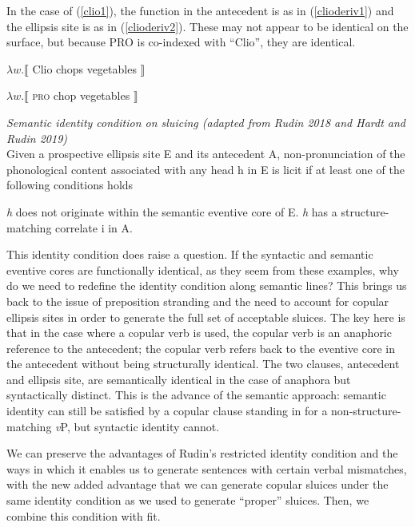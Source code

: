 \documentclass{turabian-researchpaper}
\begin{document}
In the case of (\ref{clio1}), the function in the antecedent is as in (\ref{clioderiv1}) and the ellipsis site is as in (\ref{clioderiv2}). These may not appear to be identical on the surface, but because PRO is co-indexed with ``Clio'', they are identical. 

\begin{exe}
\ex\label{clioderiv1} $\lambda w.\llbracket$ Clio chops vegetables $\rrbracket$
\end{exe}

\begin{exe}
\ex\label{clioderiv2} $\lambda w.\llbracket$ \textsc{pro} chop vegetables $\rrbracket$
\end{exe}

\begin{exe}
\ex\label{idcondonsluicing1} \textit{Semantic identity condition on sluicing (adapted from Rudin 2018 and Hardt and Rudin 2019)}\\
Given a prospective ellipsis site E and its antecedent A, non-pronunciation of the phonological content associated with any head h in E is licit if at least one of the following conditions holds
\begin{xlist}
\ex \textit{h} does not originate within the semantic eventive core of E.
\ex \textit{h} has a structure-matching correlate i in A.
\end{xlist}
\end{exe}
This identity condition does raise a question. If the syntactic and semantic eventive cores are functionally identical, as they seem from these examples, why do we need to redefine the identity condition along semantic lines? This brings us back to the issue of preposition stranding and the need to account for copular ellipsis sites in order to generate the full set of acceptable sluices. The key here is that in the case where a copular verb is used, the copular verb is an anaphoric reference to the antecedent; the copular verb refers back to the eventive core in the antecedent without being structurally identical. The two clauses, antecedent and ellipsis site, are semantically identical in the case of anaphora but syntactically distinct. This is the advance of the semantic approach: semantic identity can still be satisfied by a copular clause standing in for a non-structure-matching \textit{v}P, but syntactic identity cannot. 

We can preserve the advantages of Rudin's restricted identity condition and the ways in which it enables us to generate sentences with certain verbal mismatches, with the new added advantage that we can generate copular sluices under the same identity condition as we used to generate ``proper'' sluices. Then, we combine this condition with fit. 
\end{document}
